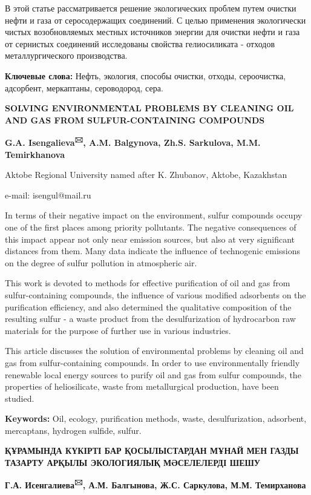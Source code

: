 В этой статье рассматривается решение экологических проблем путем
очистки нефти и газа от серосодержащих соединений. С целью применения
экологически чистых возобновляемых местных источников энергии для
очистки нефти и газа от сернистых соединений исследованы свойства
гелиосиликата - отходов металлургического производства.

{\bfseries Ключевые слова:} Нефть, экология, способы очистки, отходы,
сероочистка, адсорбент, меркаптаны, сероводород, сера.

{\bfseries SOLVING ENVIRONMENTAL PROBLEMS BY CLEANING OIL AND GAS FROM
SULFUR-CONTAINING COMPOUNDS}

{\bfseries G.A. Isengalieva\textsuperscript{🖂}, A.M. Balgynova, Zh.S.
Sarkulova, M.M. Temirkhanova}

Aktobe Regional University named after K. Zhubanov, Aktobe, Kazakhstan

e-mail: isengul@mail.ru

In terms of their negative impact on the environment, sulfur compounds
occupy one of the first places among priority pollutants. The negative
consequences of this impact appear not only near emission sources, but
also at very significant distances from them. Many data indicate the
influence of technogenic emissions on the degree of sulfur pollution in
atmospheric air.

This work is devoted to methods for effective purification of oil and
gas from sulfur-containing compounds, the influence of various modified
adsorbents on the purification efficiency, and also determined the
qualitative composition of the resulting sulfur - a waste product from
the desulfurization of hydrocarbon raw materials for the purpose of
further use in various industries.

This article discusses the solution of environmental problems by
cleaning oil and gas from sulfur-containing compounds. In order to use
environmentally friendly renewable local energy sources to purify oil
and gas from sulfur compounds, the properties of heliosilicate, waste
from metallurgical production, have been studied.

{\bfseries Keywords:} Oil, ecology, purification methods, waste,
desulfurization, adsorbent, mercaptans, hydrogen sulfide, sulfur.

{\bfseries ҚҰРАМЫНДА КҮКІРТІ БАР ҚОСЫЛЫСТАРДАН МҰНАЙ МЕН ГАЗДЫ ТАЗАРТУ
АРҚЫЛЫ ЭКОЛОГИЯЛЫҚ МӘСЕЛЕЛЕРДІ ШЕШУ}

{\bfseries Г.А. Исенгалиева\textsuperscript{🖂}, А.М. Балгынова, Ж.С.
Саркулова, М.М. Темирханова}

